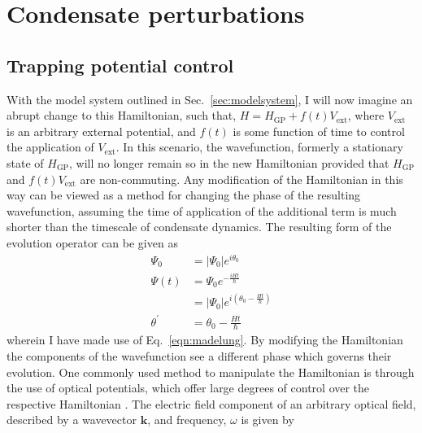 \section{Condensate perturbations}
\subsection{Trapping potential control}\label{ss:pert_opt_latt}
With the model system outlined in Sec.~\ref{sec:modelsystem}, I will now imagine an abrupt change to this Hamiltonian, such that, $H = H_{\textrm{GP}} + f(t) V_{\textrm{ext}}$, where  $V_{\textrm{ext}}$ is an arbitrary external potential, and $f(t)$ is some function of time to control the application of $V_{\textrm{ext}}$. In this scenario, the wavefunction, formerly a stationary state of $H_{\textrm{GP}}$, will no longer remain so in the new Hamiltonian provided that $H_{\textrm{GP}} $ and $f(t) V_{\textrm{ext}}$ are non-commuting. Any modification of the Hamiltonian in this way can be viewed as a method for changing the phase of the resulting wavefunction, assuming the time of application of the additional term is much shorter than the timescale of condensate dynamics.
The resulting form of the evolution operator can be given as
\begin{subequations}
\begin{align}
    \Psi_0 &= |\Psi_0|e^{i\theta_0} \\
    \Psi(t) &= \Psi_0 e^{-\frac{i H t}{\hbar}} \\
            &= |\Psi_0| e^{i\left(\theta_0 - \frac{H t}{\hbar}\right)} \nonumber \\
    \theta^{'} &= \theta_0 - \frac{H t}{\hbar}
\end{align}
\end{subequations}
wherein I have made use of Eq.~\ref{eqn:madelung}. By modifying the Hamiltonian the components of the wavefunction see a different phase which governs their evolution. One commonly used method to manipulate the Hamiltonian is through the use of optical potentials, which offer large degrees of control over the respective Hamiltonian \cite{Many-body physics with ultracold gases}. The electric field component of an arbitrary optical field, described by a wavevector $\mathbf{k}$, and frequency, $\omega$ is given by
